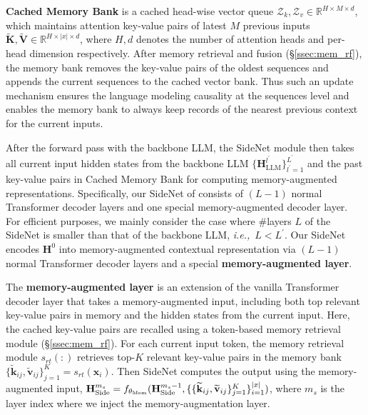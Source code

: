 \textbf{Cached Memory Bank} is a cached head-wise vector queue $\mathcal{Z}_{k},\mathcal{Z}_{v}\in \mathbb{R}^{H \times M\times d}$, which maintains attention key-value pairs of latest $M$ previous inputs $\widetilde{\mathbf{K}},\widetilde{\mathbf{V}}\in \mathbb{R}^{H\times |x|\times d}$, where $H, d$ denotes the number of attention heads and per-head dimension respectively. After memory retrieval and fusion (\S\ref{ssec:mem_rf}), the memory bank removes the key-value pairs of the oldest sequences and appends the current sequences to the cached vector bank. Thus such an update mechanism ensures the language modeling causality at the sequences level and enables the memory bank to always keep records of the nearest previous context for the current inputs.

After the forward pass with the backbone LLM, the SideNet module then takes all current input hidden states from the backbone LLM $\{\mathbf{H}_\text{LLM}^{l^\prime}\}_{{l^\prime}=1}^{L^\prime}$ and the past key-value pairs in Cached Memory Bank for computing memory-augmented representations. Specifically, our SideNet of \our{} consists of $(L-1)$ normal Transformer decoder layers and one special memory-augmented decoder layer. For efficient purposes, we mainly consider the case where \#layers $L$ of the SideNet is smaller than that of the backbone LLM, \emph{i.e.,}\ $L < {L^\prime}$.
Our SideNet encodes $\mathbf{H}^0$ into memory-augmented contextual representation via $(L-1)$ normal Transformer decoder layers and a special \textbf{memory-augmented layer}.

The \textbf{memory-augmented layer} is an extension of the vanilla Transformer decoder layer that takes a memory-augmented input, including both top relevant key-value pairs in memory and the hidden states from the current input. Here, the cached key-value pairs are recalled using a token-based memory retrieval module (\S\ref{ssec:mem_rf}).
For each current input token, the memory retrieval module $s_{rt}(:)$ retrieves top-$K$ relevant key-value pairs in the memory bank $\{\widetilde{\mathbf{\boldsymbol{k}}}_{ij},\widetilde{\mathbf{\boldsymbol{v}}}_{ij} \}_{j=1}^K=s_{rt}(\mathbf{x}_i)$.
Then SideNet computes the output using the memory-augmented input, $\mathbf{H}^{m_s}_{\text{Side}}=f_{\theta_{\textnormal{Mem}}}(\mathbf{H}_{\text{Side}}^{m_s-1}, \{\{\widetilde{\mathbf{k}}_{ij},\widetilde{\mathbf{v}}_{ij}\} _{j=1}^K \}_{i=1}^{|x|})$, where $m_s$ is the layer index where we inject the memory-augmentation layer.

